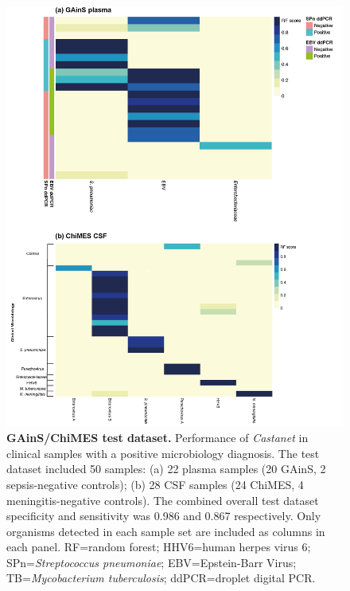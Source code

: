 \begin{figure}[htbp]
\centering
\includegraphics[scale=0.9]{./Results2/Images/rf-test.png}
\caption[GAinS/ChiMES test dataset]{\textbf{GAinS/ChiMES test dataset.} Performance of \textit{Castanet} in clinical samples with a positive microbiology diagnosis. The test dataset included 50 samples: (a) 22 plasma samples (20 GAinS, 2 sepsis-negative controls); (b) 28 CSF samples (24 ChiMES, 4 meningitis-negative controls). The combined overall test dataset specificity and sensitivity was 0.986 and 0.867 respectively. Only organisms detected in each sample set are included as columns in each panel. RF=random forest; HHV6=human herpes virus 6; SPn=\textit{Streptococcus pneumoniae}; EBV=Epstein-Barr Virus; TB=\textit{Mycobacterium tuberculosis}; ddPCR=droplet digital PCR.}
\label{fig:rf-test}
\end{figure}
\FloatBarrier

